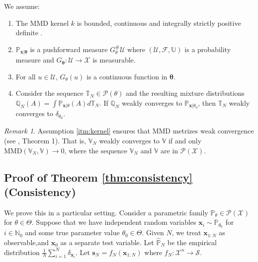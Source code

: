 \documentclass{article}
\theoremstyle{plain}
\theoremstyle{definition}
\theoremstyle{remark}
\newtheorem{remark}[theorem]{Remark}
\begin{document}
We assume:
\begin{enumerate}
  \item \label{itm:kernel}
  The MMD kernel $k$ is bounded, continuous and integrally strictly positive definite \citep{simon-gabrielMetrizingWeakConvergence2023}.
  \item \label{itm:generative1}
  $\mathbb{P}_{\mathbf{x}|\mathbf{\theta}}$ is a pushforward measure $G_\theta^\# \mathcal{U}$
  where $(\mathcal{U}, \mathcal{F}, \mathbb{U})$ is a probability measure
  and $G_\mathbf{\theta}: \mathcal{U} \to \mathcal{X}$ is measurable.
  \item \label{itm:generative2}
  For all $u \in \mathcal{U}$, $G_\theta(u)$ is a continuous function in $\mathbf{\theta}$.
  \item \label{itm:identifiability}
  Consider the sequence $\mathbb{T}_N \in \mathcal{P}(\theta)$ and the resulting mixture distributions
  $\mathbb{Q}_N(A) = \int \mathbb{P}_{\mathbf{x}|\theta}(A) d\mathbb{T}_N$.
  If $\mathbb{Q}_N$ weakly converges to $\mathbb{P}_{\mathbf{x}|\theta_0}$,
  then $\mathbb{T}_N$ weakly converges to $\delta_{\theta_0}$.
\end{enumerate}

\begin{remark} \label{rem:metrize}
Assumption \ref{itm:kernel} ensures that MMD metrizes weak convergence (see \citealp{simon-gabrielMetrizingWeakConvergence2023}, Theorem 1).
That is, $\mathbb{V}_N$ weakly converges to $\mathbb{V}$ if and only
$\mathrm{MMD}(\mathbb{V}_N, \mathbb{V}) \to 0$,
where the sequence $\mathbb{V}_N$ and $\mathbb{V}$ are in $\mathcal{P}(\mathcal{X})$.
\end{remark}

\subsection{Proof of Theorem \ref{thm:consistency} (Consistency)} \label{sec:proof_consistency}
We prove this in a particular setting.
Consider a parametric family $\mathbb{P}_\theta \in \mathcal{P}(\mathcal{X})$ for $\theta \in \Theta$.
Suppose that we have independent random variables $\mathbf{x}_i \sim \mathbb{P}_{\theta_0}$ for $i \in \mathbb{N}_0$ and some true parameter value $\theta_0 \in \Theta$.
Given $N$, we treat $\mathbf{x}_{1:N}$ as observable,and $\mathbf{x}_0$ as a separate test variable.
Let $\hat{\mathbb{P}}_N$ be the empirical distribution $\frac{1}{N} \sum_{i=1}^N \delta_{\mathbf{x}_i}$.
Let $\mathbf{s}_N = f_N(\mathbf{x}_{1:N})$ where $f_N:\mathcal{X}^{n} \to \mathcal{S}$.
\end{document}
